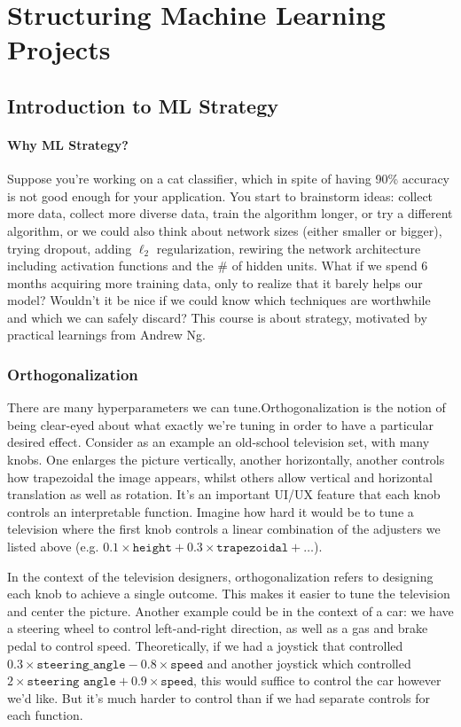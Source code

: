 \documentclass[12pt]{article}
\begin{document}
\section{Structuring Machine Learning Projects}
\subsection{Introduction to ML Strategy}
\paragraph{Why ML Strategy?} Suppose you're working on a cat classifier, which in spite of having 90\% accuracy
is not good enough for your application. You start to brainstorm ideas: collect more data, collect more diverse 
data, train the algorithm longer, or try a different algorithm, or we could also think about network sizes (either smaller or bigger), trying dropout, adding $\ell_2$ regularization, rewiring the network architecture including
activation functions and the \# of hidden units. What if we spend 6 months acquiring more training data, only to realize that it barely helps our model? Wouldn't it be nice if we could know which techniques are worthwhile and which
we can safely discard? This course is about strategy, motivated by practical learnings from Andrew Ng. 

\subsubsection{Orthogonalization} There are many hyperparameters we can tune.Orthogonalization is the notion of being clear-eyed about what exactly we're tuning in order to have a particular desired effect. Consider as an example an old-school television set, with many knobs. One enlarges the picture vertically, another horizontally, another controls 
how trapezoidal the image appears, whilst others allow vertical and horizontal translation as well as rotation. It's an important UI/UX feature that each knob controls an interpretable function. Imagine how hard it would be to tune a
television where the first knob controls a linear combination of the adjusters we listed above (e.g.
$0.1 \times \texttt{height} + 0.3 \times \texttt{trapezoidal} + \ldots$). 

In the context of the television designers,
orthogonalization refers to designing each knob to achieve a single outcome. This makes it easier to tune the television and center the picture. Another example could be in the context of a car: we have a steering wheel to control left-and-right direction, as well as a gas and brake pedal to control speed. Theoretically, if we had a joystick that controlled $0.3 \times \texttt{steering\_angle} - 0.8 \times \texttt{speed}$ and another joystick which controlled 
$2 \times \texttt{steering angle} + 0.9 \times \texttt{speed}$, this would suffice to control the car however we'd like. But it's much harder to control than if we had separate controls for each function. 
\end{document}
